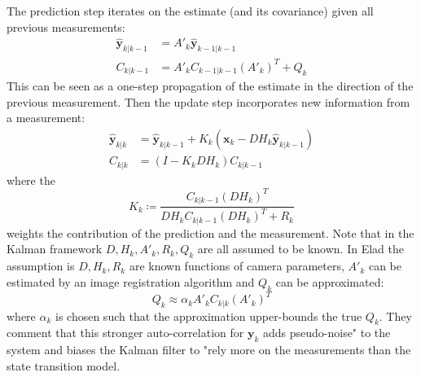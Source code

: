 %
The prediction step iterates on the estimate (and its covariance) given all previous measurements:
\begin{align}
    \hat{\bm{y}}_{k|k-1} & = A'_k \hat{\bm{y}}_{k-1|k-1}     \\
    C_{k|k-1}            & = A'_k C_{k-1|k-1} (A'_k)^T + Q_k
\end{align}
This can be seen as a one-step propagation of the estimate in the direction of the previous measurement.
%
Then the update step incorporates new information from a measurement:
\begin{align}
    \hat{\bm{y}}_{k|k} & = \hat{\bm{y}}_{k|k-1} + K_k(\bm{x}_k - DH_k\hat{\bm{y}}_{k|k-1} ) \\
    C_{k|k}            & = (I - K_k DH_k)C_{k|k-1}
\end{align}
where the 
\begin{equation}
    K_k \coloneqq \frac{C_{k|k-1}(DH_k)^T}{DH_k C_{k|k-1} (DH_k)^T + R_k }
\end{equation}
weights the contribution of the prediction and the measurement.
%
Note that in the Kalman framework \(D, H_k, A'_k, R_k, Q_k\) are all assumed to be known.
%
In Elad \etal \cite{elad1999} the assumption is \(D, H_k, R_k\) are known functions of camera parameters, \(A'_k\) can be estimated by an image registration algorithm and \(Q_k\) can be approximated:
\begin{equation}
    Q_k \approx \alpha_k A'_k C_{k|k} (A'_k)^T
\end{equation}
where \(\alpha_k\) is chosen such that the approximation upper-bounds the true \(Q_k\).
%
They comment that this stronger auto-correlation for \(\bm{y}_k\) adds pseudo-noise" to the system and biases the Kalman filter to "rely more on the measurements than the state transition model.

